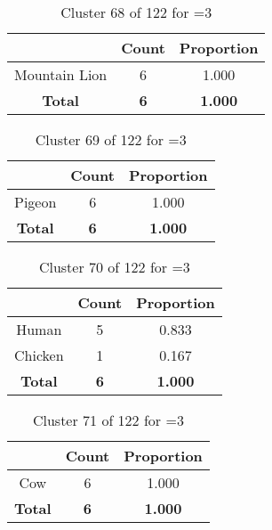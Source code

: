\begin{table}[ht!]
\centering
\begin{tabular}{|c|c|c|}
\hline
\bf \Spec{} &\bf Count &\bf Proportion\\ \hline \hline
Mountain Lion & 6 & 1.000\\ \hline
\hline
\bf Total & \bf 6 & \bf 1.000\\ \hline
\end{tabular}
\label{tab:cluster:68:3}
\caption{Cluster 68 of 122 for \minneigh{}=3}
\end{table}

\begin{table}[ht!]
\centering
\begin{tabular}{|c|c|c|}
\hline
\bf \Spec{} &\bf Count &\bf Proportion\\ \hline \hline
Pigeon & 6 & 1.000\\ \hline
\hline
\bf Total & \bf 6 & \bf 1.000\\ \hline
\end{tabular}
\label{tab:cluster:69:3}
\caption{Cluster 69 of 122 for \minneigh{}=3}
\end{table}

\clearpage
\begin{table}[ht!]
\centering
\begin{tabular}{|c|c|c|}
\hline
\bf \Spec{} &\bf Count &\bf Proportion\\ \hline \hline
Human & 5 & 0.833\\ \hline
Chicken & 1 & 0.167\\ \hline
\hline
\bf Total & \bf 6 & \bf 1.000\\ \hline
\end{tabular}
\label{tab:cluster:70:3}
\caption{Cluster 70 of 122 for \minneigh{}=3}
\end{table}

\begin{table}[ht!]
\centering
\begin{tabular}{|c|c|c|}
\hline
\bf \Spec{} &\bf Count &\bf Proportion\\ \hline \hline
Cow & 6 & 1.000\\ \hline
\hline
\bf Total & \bf 6 & \bf 1.000\\ \hline
\end{tabular}
\label{tab:cluster:71:3}
\caption{Cluster 71 of 122 for \minneigh{}=3}
\end{table}

